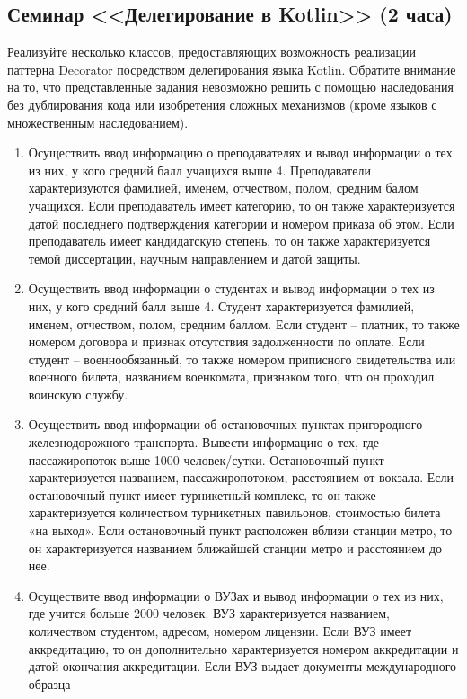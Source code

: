 \subsection{Семинар <<Делегирование в Kotlin>> (2 часа)} 

Реализуйте несколько классов, предоставляющих возможность реализации паттерна Decorator посредством делегирования языка Kotlin. Обратите внимание на то, что представленные задания невозможно решить с помощью наследования без дублирования кода или изобретения сложных механизмов (кроме языков с множественным наследованием).

\begin{enumerate}
\item Осуществить ввод информацию о преподавателях и вывод информации о тех из них, у кого
средний балл учащихся выше 4. Преподаватели характеризуются фамилией, именем, отчеством,
полом, средним балом учащихся. Если преподаватель имеет категорию, то он также характеризуется датой последнего подтверждения категории и номером приказа об этом. Если преподаватель
имеет кандидатскую степень, то он также характеризуется темой диссертации, научным направлением и датой защиты.
\item Осуществить ввод информации о студентах и вывод информации о тех из них, у кого средний
балл выше 4. Студент характеризуется фамилией, именем, отчеством, полом, средним баллом.
Если студент – платник, то также номером договора и признак отсутствия задолженности по
оплате. Если студент – военнообязанный, то также номером приписного свидетельства или военного билета, названием военкомата, признаком того, что он проходил воинскую службу.
\item Осуществить ввод информации об остановочных пунктах пригородного железнодорожного транспорта. Вывести информацию о тех, где пассажиропоток выше 1000 человек/сутки. Остановочный
пункт характеризуется названием, пассажиропотоком, расстоянием от вокзала. Если остановочный пункт имеет турникетный комплекс, то он также характеризуется количеством турникетных
павильонов, стоимостью билета «на выход». Если остановочный пункт расположен вблизи станции метро, то он характеризуется названием ближайшей станции метро и расстоянием до нее.
\item Осуществите ввод информации о ВУЗах и вывод информации о тех из них, где учится больше
2000 человек. ВУЗ характеризуется названием, количеством студентом, адресом, номером лицензии. Если ВУЗ имеет аккредитацию, то он дополнительно характеризуется номером аккредитации и датой окончания аккредитации. Если ВУЗ выдает документы международного образца

\end{enumerate}
